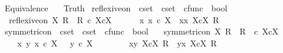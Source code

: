%
\begin{isabellebody}%
%
%
\isadelimtheory
%
\endisadelimtheory
%
\isatagtheory
{}\isamarkupfalse%
\ Equivalence\isanewline
\ \ \ Truth\isanewline
{}%
\endisatagtheory
{\isafoldtheory}%
%
\isadelimtheory
%
\endisadelimtheory
%
\isadelimdocument
%
\endisadelimdocument
%
\isatagdocument
%
\isamarkuptrue%
%
\endisatagdocument
{\isafolddocument}%
%
\isadelimdocument
%
\endisadelimdocument
{}\isamarkupfalse%
\ reflexive{\isacharunderscore}{\kern0pt}on\ {\isacharcolon}{\kern0pt}{\isacharcolon}{\kern0pt}\ {\isachardoublequoteopen}cset\ {\isasymRightarrow}\ cset\ {\isasymtimes}\ cfunc\ {\isasymRightarrow}\ bool{\isachardoublequoteclose}\ \isanewline
\ \ {\isachardoublequoteopen}reflexive{\isacharunderscore}{\kern0pt}on\ X\ R\ {\isacharequal}{\kern0pt}\ {\isacharparenleft}{\kern0pt}R\ {\isasymsubseteq}\isactrlsub c\ X{\isasymtimes}\isactrlsub cX\ {\isasymand}\ \isanewline
\ \ \ \ {\isacharparenleft}{\kern0pt}{\isasymforall}x{\isachardot}{\kern0pt}\ x\ {\isasymin}\isactrlsub c\ X\ {\isasymlongrightarrow}\ {\isacharparenleft}{\kern0pt}{\isasymlangle}x{\isacharcomma}{\kern0pt}x{\isasymrangle}\ {\isasymin}\isactrlbsub X{\isasymtimes}\isactrlsub cX\isactrlesub \ R{\isacharparenright}{\kern0pt}{\isacharparenright}{\kern0pt}{\isacharparenright}{\kern0pt}{\isachardoublequoteclose}\isanewline
\isanewline
{}\isamarkupfalse%
\ symmetric{\isacharunderscore}{\kern0pt}on\ {\isacharcolon}{\kern0pt}{\isacharcolon}{\kern0pt}\ {\isachardoublequoteopen}cset\ {\isasymRightarrow}\ cset\ {\isasymtimes}\ cfunc\ {\isasymRightarrow}\ bool{\isachardoublequoteclose}\ \isanewline
\ \ {\isachardoublequoteopen}symmetric{\isacharunderscore}{\kern0pt}on\ X\ R\ {\isacharequal}{\kern0pt}\ {\isacharparenleft}{\kern0pt}R\ \ {\isasymsubseteq}\isactrlsub c\ X{\isasymtimes}\isactrlsub cX\ {\isasymand}\isanewline
\ \ \ \ {\isacharparenleft}{\kern0pt}{\isasymforall}x\ y{\isachardot}{\kern0pt}\ x\ {\isasymin}\isactrlsub c\ X\ {\isasymand}\ \ y\ {\isasymin}\isactrlsub c\ X\ {\isasymlongrightarrow}\ \isanewline
\ \ \ \ \ \ {\isacharparenleft}{\kern0pt}{\isasymlangle}x{\isacharcomma}{\kern0pt}y{\isasymrangle}\ {\isasymin}\isactrlbsub X{\isasymtimes}\isactrlsub cX\isactrlesub \ R\ {\isasymlongrightarrow}\ {\isasymlangle}y{\isacharcomma}{\kern0pt}x{\isasymrangle}\ {\isasymin}\isactrlbsub X{\isasymtimes}\isactrlsub cX\isactrlesub \ R{\isacharparenright}{\kern0pt}{\isacharparenright}{\kern0pt}{\isacharparenright}{\kern0pt}{\isachardoublequoteclose}\ \isanewline

\end{isabellebody}
